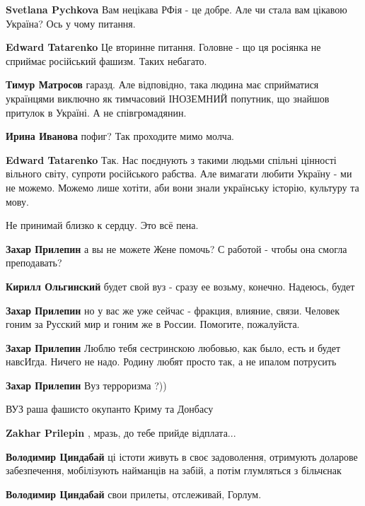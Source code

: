 \begin{itemize}
\begin{itemize}
\textbf{Svetlana Pychkova} Вам нецікава РФія - це добре. Але чи стала вам цікавою Україна? Ось у чому питання.

\textbf{Edward Tatarenko} Це вторинне питання. Головне - що ця росіянка не сприймає російський фашизм. Таких небагато.

\textbf{Тимур Матросов} гаразд. Але відповідно, така людина має сприйматися українцями виключно як тимчасовий ІНОЗЕМНИЙ попутник, що знайшов притулок в Україні. А не співгромадянин.

\textbf{Ирина Иванова} пофиг? Так проходите мимо молча.

\textbf{Edward Tatarenko} Так. Нас поєднують з такими людьми спільні цінності вільного світу, супроти російського рабства. Але вимагати любити Україну - ми не можемо. Можемо лише хотіти, аби вони знали українську історію, культуру та мову.

\end{itemize} %

Не принимай близко к сердцу. Это всё пена.

\begin{itemize} %
\textbf{Захар Прилепин} а вы не можете Жене помочь? С работой - чтобы она смогла преподавать?

\textbf{Кирилл Ольгинский} будет свой вуз - сразу ее возьму, конечно. Надеюсь, будет

\textbf{Захар Прилепин} но у вас же уже сейчас - фракция, влияние, связи. Человек гоним за Русский мир и гоним же в России. Помогите, пожалуйста.

\textbf{Захар Прилепин} Люблю тебя сестринскою любовью, как было, есть и будет навсИгда. Ничего не надо. Родину любят просто так, а не ипалом потрусить

\textbf{Захар Прилепин} Вуз терроризма ?))

ВУЗ раша фашисто окупанто Криму та Донбасу

\textbf{Zakhar Prilepin} , мразь, до тебе прийде відплата...

\textbf{Володимир Циндабай} ці істоти живуть в своє задоволення, отримують доларове забезпечення, мобілізують найманців на забій, а потім глумляться з більчєнак

\textbf{Володимир Циндабай} свои прилеты, отслеживай, Горлум.
\end{itemize} %


\end{itemize}
